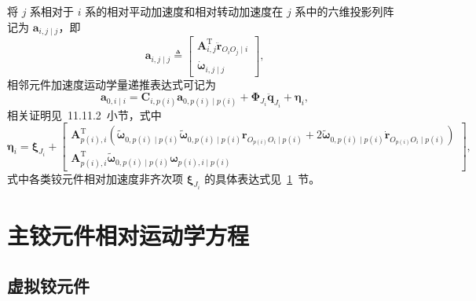 将 $j$ 系相对于 $i$ 系的相对平动加速度和相对转动加速度在 $j$ 系中的六维投影列阵记为 $\boldsymbol{a}_{i,j \mid j}$，即
\begin{equation}\label{eq:10.8}
  \boldsymbol{a}_{i,j \mid j} \triangleq \begin{bmatrix} \boldsymbol{A}_{i,j}^{\mathrm{T}} \ddot{\boldsymbol{r}}_{O_i O_j \mid i} \\ \dot{\boldsymbol{\omega}}_{i,j \mid j} \end{bmatrix},
\end{equation}
相邻元件加速度运动学量递推表达式可记为
\begin{equation}\label{eq:10.9}
  \boldsymbol{a}_{0,i \mid i} = \boldsymbol{C}_{i,p(i)} \boldsymbol{a}_{0,p(i) \mid p(i)} + \boldsymbol{\Phi}_{J_i} \ddot{\boldsymbol{q}}_{J_i} + \boldsymbol{\eta}_i,
\end{equation}
相关证明见~11.11.2~小节，式中
\begin{equation}\label{eq:10.10}
  \boldsymbol{\eta}_i = \boldsymbol{\xi}_{J_i} + \begin{bmatrix}
    \boldsymbol{A}_{p(i),i}^{\mathrm{T}} \left( \tilde{\boldsymbol{\omega}}_{0,p(i) \mid p(i)} \tilde{\boldsymbol{\omega}}_{0,p(i) \mid p(i)} \boldsymbol{r}_{O_{p(i)} O_i \mid p(i)} + 2 \tilde{\boldsymbol{\omega}}_{0,p(i) \mid p(i)} \dot{\boldsymbol{r}}_{O_{p(i)} O_i \mid p(i)} \right) \\[4pt]
    \boldsymbol{A}_{p(i),i}^{\mathrm{T}} \tilde{\boldsymbol{\omega}}_{0,p(i) \mid p(i)} \boldsymbol{\omega}_{p(i),i \mid p(i)}
  \end{bmatrix},
\end{equation}
式中各类铰元件相对加速度非齐次项 $\boldsymbol{\xi}_{J_i}$ 的具体表达式见~\ref{sec:10.3}~节。

\section{主铰元件相对运动学方程}\label{sec:10.3}

\subsection{虚拟铰元件}

